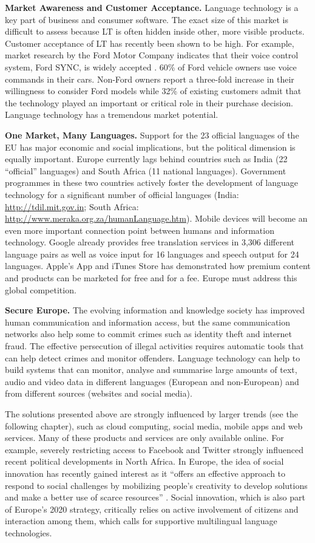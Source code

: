 \documentclass[10pt, plain]{../../metanetpaper}
\begin{document}
\begin{multicols}{2}
\textbf{Market Awareness and Customer Acceptance.} Language technology is a key part of business and consumer software. The exact size of this market is difficult to assess because LT is often hidden inside other, more visible products. Customer acceptance of LT has recently been shown to be high. For example, market research by the Ford Motor Company indicates that their voice control system, Ford SYNC, is widely accepted \cite{ford}. 60\% of Ford vehicle owners use voice commands in their cars. Non-Ford owners report a three-fold increase in their willingness to consider Ford models while 32\% of existing customers admit that the technology played an important or critical role in their purchase decision. Language technology has a tremendous market potential.

\textbf{One Market, Many Languages.} Support for the 23 official languages of the EU has major economic and social implications, but the political dimension is equally important. Europe currently lags behind countries such as India (22 “official” languages) and South Africa (11 national languages). Government programmes in these two countries actively foster the development of language technology for a significant number of official languages (India: \url{http://tdil.mit.gov.in}; South Africa: \url{http://www.meraka.org.za/humanLanguage.htm}). Mobile devices will become an even more important connection point between humans and information technology. Google already provides free translation services in 3,306 different language pairs as well as voice input for 16 languages and speech output for 24 languages. Apple's App and iTunes Store has demonstrated how premium content and products can be marketed for free and for a fee. Europe must address this global competition.

\textbf{Secure Europe.} The evolving information and knowledge society has improved human communication and information access, but the same communication networks also help some to commit crimes such as identity theft and internet fraud. The effective persecution of illegal activities requires automatic tools that can help detect crimes and monitor offenders. Language technology can help to build systems that can monitor, analyse and summarise large amounts of text, audio and video data in different languages (European and non-European) and from different sources (websites and social media).

The solutions presented above are strongly influenced by larger trends (see the following chapter), such as cloud computing, social media, mobile apps and web services. Many of these products and services are only available online. For example, severely restricting access to Facebook and Twitter strongly influenced recent political developments in North Africa. In Europe, the idea of social innovation has recently gained interest as it “offers an effective approach to respond to social challenges by mobilizing people's creativity to develop solutions and make a better use of scarce resources” \cite{EC5}. Social innovation, which is also part of Europe’s 2020 strategy, critically relies on active involvement of citizens and interaction among them, which calls for supportive multilingual language technologies.


\end{multicols}
\end{document}
